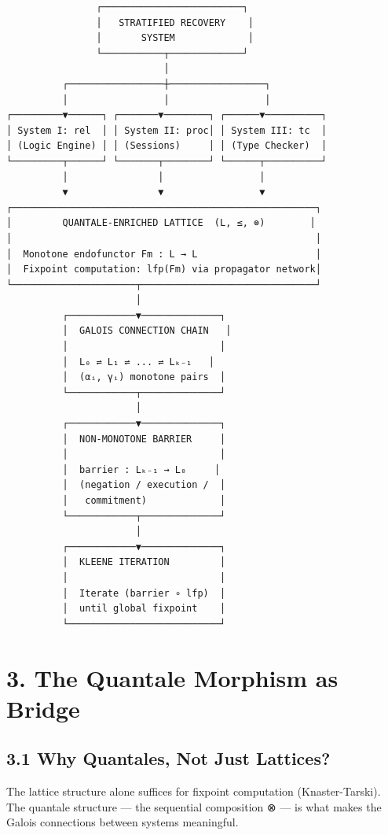 \documentclass[11pt]{article}
\begin{document}
\begin{verbatim}
                ┌─────────────────────────┐
                │   STRATIFIED RECOVERY    │
                │       SYSTEM             │
                └───────────┬─────────────┘
                            │
          ┌─────────────────┼─────────────────┐
          │                 │                 │
┌─────────▼──────┐ ┌───────▼────────┐ ┌──────▼──────────┐
│ System I: rel  │ │ System II: proc│ │ System III: tc  │
│ (Logic Engine) │ │ (Sessions)     │ │ (Type Checker)  │
└─────────┬──────┘ └───────┬────────┘ └──────┬──────────┘
          │                │                 │
          ▼                ▼                 ▼
┌──────────────────────────────────────────────────────┐
│         QUANTALE-ENRICHED LATTICE  (L, ≤, ⊗)        │
│                                                      │
│  Monotone endofunctor Fm : L → L                     │
│  Fixpoint computation: lfp(Fm) via propagator network│
└──────────────────────┬───────────────────────────────┘
                       │
          ┌────────────▼──────────────┐
          │  GALOIS CONNECTION CHAIN   │
          │                           │
          │  L₀ ⇌ L₁ ⇌ ... ⇌ Lₖ₋₁   │
          │  (αᵢ, γᵢ) monotone pairs  │
          └────────────┬──────────────┘
                       │
          ┌────────────▼──────────────┐
          │  NON-MONOTONE BARRIER     │
          │                           │
          │  barrier : Lₖ₋₁ → L₀     │
          │  (negation / execution /  │
          │   commitment)             │
          └────────────┬──────────────┘
                       │
          ┌────────────▼──────────────┐
          │  KLEENE ITERATION         │
          │                           │
          │  Iterate (barrier ∘ lfp)  │
          │  until global fixpoint    │
          └───────────────────────────┘
\end{verbatim}
\section{3. The Quantale Morphism as Bridge}
\label{sec:orgd509611}

\subsection{3.1 Why Quantales, Not Just Lattices?}
\label{sec:org137e16e}

The lattice structure alone suffices for fixpoint computation (Knaster-Tarski).
The quantale structure — the sequential composition ⊗ — is what makes the
Galois connections between systems meaningful.
\end{document}

